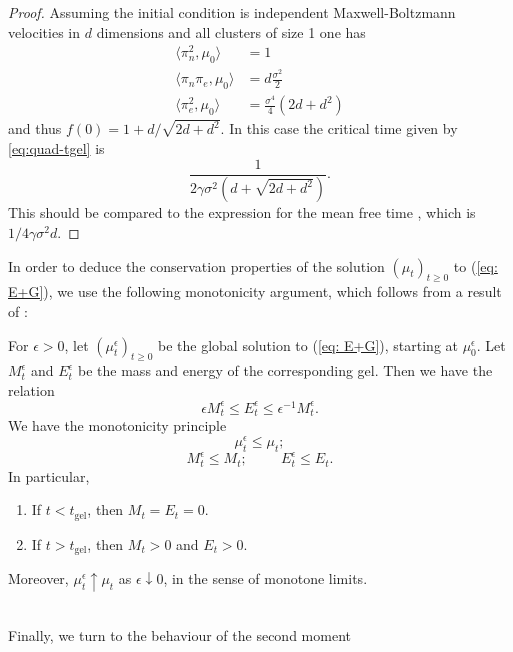 \begin{proof}
Assuming the initial condition is independent Maxwell-Boltzmann velocities in $d$ dimensions and all clusters of size 1 one has
\begin{align*}
    \langle \pi_n^2, \mu_0\rangle &= 1\\
    \langle \pi_n \pi_e, \mu_0\rangle &= d\frac{\sigma^2}{2}\\
    \langle \pi_e^2, \mu_0\rangle &= \frac{\sigma^4}{4}\left(2d + d^2\right)
\end{align*}
and thus $f(0) = 1 + d / \sqrt{2d + d^2}$.
In this case the critical time given by \eqref{eq:quad-tgel} is
\begin{equation}
    \frac{1}{2\gamma \sigma^2 \left(d + \sqrt{2d +d^2}\right)}.
\end{equation}
This should be compared to the expression for the mean free time \cite[equation 4.38]{PSW17}, which is $1/4\gamma \sigma^2 d$. \end{proof} \fi In order to deduce the conservation properties of the solution $(\mu_t)_{t\geq 0}$ to (\ref{eq: E+G}), we use the following monotonicity argument, which follows from a result of \cite{N00}: \begin{lemma}\label{lemma: connecting mu-epsilon and mu}
    For $\epsilon>0$, let $(\mu^\epsilon_t)_{t\geq 0}$ be the global solution to (\ref{eq: E+G}), starting at $\mu_0^\epsilon.$ Let $M^\epsilon_t$ and $E^\epsilon_t$ be the mass and energy of the corresponding gel. Then we have the relation \begin{equation}
        \epsilon M^\epsilon_t \leq E^\epsilon_t \leq \epsilon^{-1}M^\epsilon_t.
    \end{equation}We have the monotonicity principle\begin{equation}
        \mu^\epsilon_t \leq \mu_t;
    \end{equation}\begin{equation}
        M^\epsilon_t \leq M_t; \hspace{1cm} E^\epsilon_t \le E_t.
    \end{equation}
 In particular, \begin{enumerate}[label=\roman{*}).]
        \item If $t<t_\text{gel}$, then $M_t=E_t=0$.
        \item If $t>t_\text{gel}$, then $M_t >0$ and $E_t>0$.
    \end{enumerate} Moreover, $\mu^\epsilon_t\uparrow \mu_t$ as $\epsilon\downarrow 0$, in the sense of monotone limits.
\end{lemma}  \medskip \\ Finally, we turn to the behaviour of the second moment

